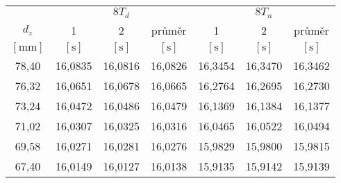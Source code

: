 \begin{tabular}{ccccccc}																																					\toprule
						&	\multicolumn{3}{c}{$8 T_d$}											&	\multicolumn{3}{c}{$8 T_n$}											\\
							\cmidrule(l){2-4}														\cmidrule(l){5-7}		
$d_z$					&	1					&	2					&	průměr				&	1					&	2					&	průměr				\\
$[\si{\milli\metre}]$	&	$[\si{\second}]$	&	$[\si{\second}]$	&	$[\si{\second}]$	&	$[\si{\second}]$	&	$[\si{\second}]$	&	$[\si{\second}]$	\\	\midrule
78,40					&	16,0835				&	16,0816				&	16,0826				&	16,3454				&	16,3470				&	16,3462				\\
76,32					&	16,0651				&	16,0678				&	16,0665				&	16,2764				&	16,2695				&	16,2730				\\
73,24					&	16,0472				&	16,0486				&	16,0479				&	16,1369				&	16,1384				&	16,1377				\\
71,02					&	16,0307				&	16,0325				&	16,0316				&	16,0465				&	16,0522				&	16,0494				\\
69,58					&	16,0271				&	16,0281				&	16,0276				&	15,9829				&	15,9800				&	15,9815				\\
67,40					&	16,0149				&	16,0127				&	16,0138				&	15,9135				&	15,9142				&	15,9139				\\	\bottomrule

\end{tabular}